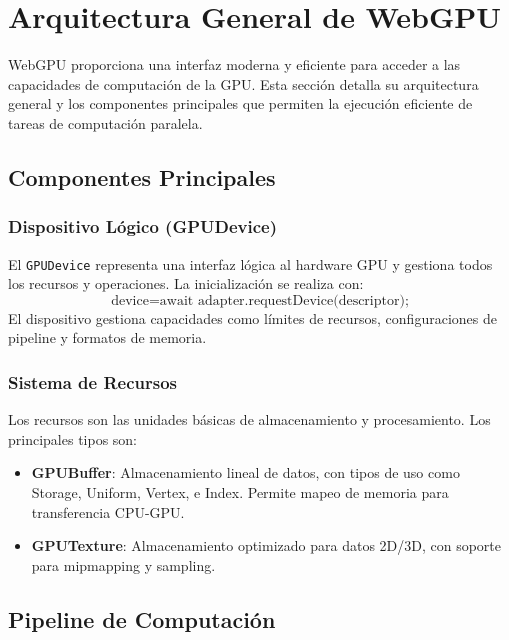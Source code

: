 \section{Arquitectura General de WebGPU}
\label{sec:webgpu-architecture}

WebGPU proporciona una interfaz moderna y eficiente para acceder a las capacidades de computación de la GPU. Esta sección detalla su arquitectura general y los componentes principales que permiten la ejecución eficiente de tareas de computación paralela.

\subsection{Componentes Principales}
\label{subsec:main-components}

\subsubsection{Dispositivo Lógico (GPUDevice)}
El \texttt{GPUDevice} representa una interfaz lógica al hardware GPU y gestiona todos los recursos y operaciones. La inicialización se realiza con:
\begin{equation}
    \text{device} = \text{await adapter.requestDevice(descriptor);}
\end{equation}
El dispositivo gestiona capacidades como límites de recursos, configuraciones de pipeline y formatos de memoria.

\subsubsection{Sistema de Recursos}
Los recursos son las unidades básicas de almacenamiento y procesamiento. Los principales tipos son:
\begin{itemize}
    \item \textbf{GPUBuffer}: Almacenamiento lineal de datos, con tipos de uso como Storage, Uniform, Vertex, e Index. Permite mapeo de memoria para transferencia CPU-GPU.
    \item \textbf{GPUTexture}: Almacenamiento optimizado para datos 2D/3D, con soporte para mipmapping y sampling.
\end{itemize}

\subsection{Pipeline de Computación}
\label{subsec:compute-pipeline}

